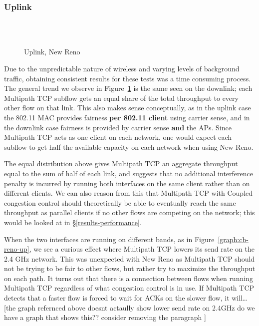 \subsubsection{Uplink}
\label{sec:results-mptcp-up}

\begin{figure}[h]
  \centering
  \\
  \subfloat[][2.4 GHz, non-overlapping channels] {\
    \scalebox{0.70}{}\label{graph:cc-reno-up}
  }
  \\
  \subfloat[][5 and 2.4 GHz] {\
    \scalebox{0.70}{}\label{graph:cb-reno-up}
  }
  \caption{Uplink, New Reno}\label{graph:reno-up}
\end{figure}

Due to the unpredictable nature of wireless and varying levels of background
traffic, obtaining consistent results for these tests was a time consuming
process. The general trend we observe in Figure~\ref{graph:reno-up} is the
same seen on the downlink; each Multipath TCP subflow gets an equal
share of the total throughput to every other flow on that link. This also makes
sense conceptually, as in the uplink case the 802.11 MAC provides fairness
\textbf{per 802.11 client} using carrier sense, and in the downlink case
fairness is provided by carrier sense \textbf{and} the APs. Since Multipath TCP
acts as one client on each network, one would expect each subflow to get half
the available capacity on each network when using New Reno.

The equal distribution above gives Multipath TCP an aggregate throughput equal
to the sum of half of each link, and suggests that no additional interference
penalty is incurred by running both interfaces on the same client rather than on
different clients. We can also reason from this that Multipath TCP with Coupled
congestion control should theoretically be able to eventually reach the same
throughput as parallel clients if no other flows are competing on the network; 
this would be looked at in \S\ref{results-performance}.

When the two interfaces are running on different bands, as in
Figure~\ref{graph:cb-reno-up}, we see a curious effect where Multipath TCP
lowers its send rate on the 2.4 GHz network. This was unexpected with New Reno
as Multipath TCP should not be trying to be fair to other flows, but rather try
to maximize the throughput on each path. It turns out that there is a connection
between flows when running Multipath TCP regardless of what congestion control
is in use. If Multipath TCP detects that a faster flow is forced to wait for
ACKs on the slower flow, it will…
[the graph refernced above doesnt actaully show lower send rate on 2.4GHz
do we have a graph that shows this?? consider removing the paragraph ]
